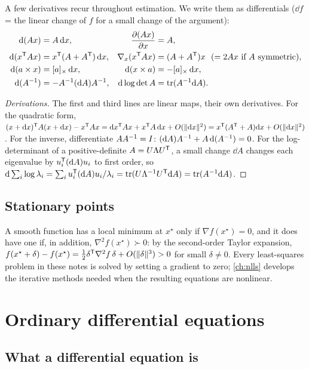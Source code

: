 A few derivatives recur throughout estimation. We write them as differentials ($\dd f$ = the linear change of $f$ for a small change of the
argument):
\begin{align}
  \mathrm{d}(Ax) &= A\,\mathrm{d} x, & \frac{\partial (Ax)}{\partial x} &= A, \\
  \mathrm{d}(x^{\mathsf{T}} Ax) &= x^{\mathsf{T}}(A + A^{\mathsf{T}})\,\mathrm{d} x, & \nabla_x(x^{\mathsf{T}} Ax) &= (A + A^{\mathsf{T}})x \ \ (= 2Ax \text{ if } A \text{ symmetric}), \\
  \mathrm{d}(a\times x) &= [a]_{\times}\,\mathrm{d} x, & \mathrm{d}(x \times a) &= -[a]_{\times}\,\mathrm{d} x, \\
  \mathrm{d}(A^{-1}) &= -A^{-1}(\mathrm{d} A)A^{-1}, & \mathrm{d}\log\det A &= \operatorname{tr}(A^{-1}\mathrm{d} A) .
\end{align}
\begin{proof}[Derivations]
The first and third lines are linear maps, their own derivatives. For the quadratic form,
$(x + \mathrm{d} x)^{\mathsf{T}} A(x + \mathrm{d} x) - x^{\mathsf{T}} Ax = \mathrm{d} x^{\mathsf{T}} Ax + x^{\mathsf{T}} A\,\mathrm{d} x + O(\|\mathrm{d} x\|^2) = x^{\mathsf{T}}(A^{\mathsf{T}} + A)\mathrm{d} x + O(\|\mathrm{d} x\|^2)$. For the inverse,
differentiate $AA^{-1} = I$: $(\mathrm{d} A)A^{-1} + A\,\mathrm{d}(A^{-1}) = 0$. For the log-determinant of a positive-definite $A = U\Lambda U^{\mathsf{T}}$, a small
change $\dd A$ changes each eigenvalue by $u_i^{\mathsf{T}}(\mathrm{d} A)u_i$ to first order, so
$\mathrm{d}\sum_i\log\lambda_i = \sum_iu_i^{\mathsf{T}}(\mathrm{d} A)u_i/\lambda_i = \operatorname{tr}(U\Lambda^{-1} U^{\mathsf{T}}\mathrm{d} A) = \operatorname{tr}(A^{-1}\mathrm{d} A)$.
\end{proof}

\subsection{Stationary points}

A smooth function has a local minimum at $x^\star$ only if $\nabla f(x^\star) = 0$, and it does have one if, in addition,
$\nabla^2f(x^\star) \succ 0$: by the second-order Taylor expansion, $f(x^\star + \delta) - f(x^\star) = \tfrac12\delta^{\mathsf{T}}\nabla^2f\,\delta + O(\|\delta\|^3) > 0$
for small $\delta \neq 0$. Every least-squares problem in these notes is solved by setting a gradient to zero; \cref{ch:nlls} develops the
iterative methods needed when the resulting equations are nonlinear.

\section{Ordinary differential equations}

\subsection{What a differential equation is}

